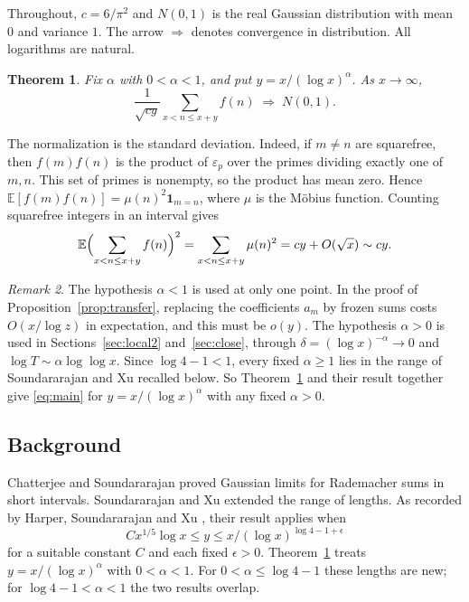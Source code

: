 \documentclass[11pt]{amsart}
\newtheorem{theorem}{Theorem}[section]
\theoremstyle{remark}
\newtheorem{remark}[theorem]{Remark}
\numberwithin{equation}{section}
\newcommand{\E}{\mathbb{E}}
\newcommand{\one}{\mathbf{1}}
\begin{document}
Throughout, $c=6/\pi^2$ and $N(0,1)$ is the real Gaussian distribution with mean $0$ and variance $1$. The arrow $\Rightarrow$ denotes convergence in distribution. All logarithms are natural.

\begin{theorem}\label{thm:main}
Fix $\alpha$ with $0<\alpha<1$, and put $y=x/(\log x)^\alpha$. As $x\to\infty$,
\begin{equation}\label{eq:main}
\frac{1}{\sqrt{cy}}\sum_{x<n\le x+y}f(n)\;\Rightarrow\; N(0,1).
\end{equation}
\end{theorem}

The normalization is the standard deviation. Indeed, if $m\ne n$ are squarefree, then $f(m)f(n)$ is the product of $\varepsilon_p$ over the primes dividing exactly one of $m,n$. This set of primes is nonempty, so the product has mean zero. Hence $\E[f(m)f(n)]=\mu(n)^2\one_{m=n}$, where $\mu$ is the M\"obius function. Counting squarefree integers in an interval gives
\[
\E\Bigl(\sum_{x<n\le x+y}f(n)\Bigr)^2=\sum_{x<n\le x+y}\mu(n)^2=cy+O(\sqrt{x})\sim cy .
\]

\begin{remark}\label{rem:range}
The hypothesis $\alpha<1$ is used at only one point. In the proof of Proposition~\ref{prop:transfer}, replacing the coefficients $a_m$ by frozen sums costs $O(x/\log z)$ in expectation, and this must be $o(y)$. The hypothesis $\alpha>0$ is used in Sections~\ref{sec:local2} and~\ref{sec:close}, through $\delta=(\log x)^{-\alpha}\to0$ and $\log T\sim\alpha\log\log x$. Since $\log4-1<1$, every fixed $\alpha\ge1$ lies in the range of Soundararajan and Xu recalled below. So Theorem~\ref{thm:main} and their result together give \eqref{eq:main} for $y=x/(\log x)^\alpha$ with any fixed $\alpha>0$.
\end{remark}

\subsection{Background}
Chatterjee and Soundararajan \cite[Theorem~1.1]{CS} proved Gaussian limits for Rademacher sums in short intervals. Soundararajan and Xu \cite[Section~9]{SX} extended the range of lengths. As recorded by Harper, Soundararajan and Xu \cite[Section~1]{HSX}, their result applies when
\[
Cx^{1/5}\log x\le y\le x/(\log x)^{\log 4-1+\epsilon}
\]
for a suitable constant $C$ and each fixed $\epsilon>0$. Theorem~\ref{thm:main} treats $y=x/(\log x)^\alpha$ with $0<\alpha<1$. For $0<\alpha\le\log4-1$ these lengths are new; for $\log4-1<\alpha<1$ the two results overlap.
\end{document}

